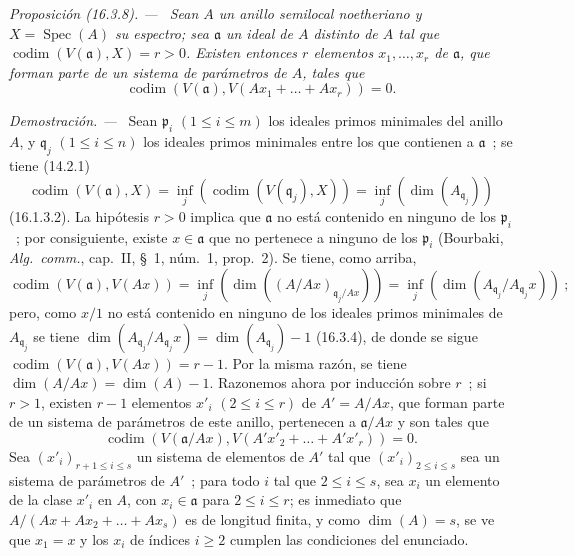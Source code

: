 \documentclass[10pt,oneside]{book}
\makeatletter
\newcommand{\setmanualcurrentlabel}[1]{\def\@currentlabel{#1}}
\newcommand{\oldpage}[2][]{%
  \setcounter{footnote}{0}%
  \marginpar{\scriptsize\textbf{#1}~|~#2}\ignorespaces}
\newenvironment{proposition}[1][]{%
  \setmanualcurrentlabel{#1}\par\medskip\noindent\itshape Proposición (#1). ---\ }{\par}
\newenvironment{proof}{%
  \par\medskip\noindent\textit{Demostración. ---\ }}{\par}
\makeatother
\begin{document}
\oldpage[0\textsubscript{IV-1}]{31}

\begin{proposition}[16.3.8]
\label{0.16.3.8-es}
Sean $A$ un anillo semilocal noetheriano y $X=\operatorname{Spec}(A)$ su
espectro; sea $\mathfrak{a}$ un ideal de $A$ distinto de $A$ tal que
$\operatorname{codim}(V(\mathfrak{a}),X)=r>0$. Existen entonces $r$ elementos
$x_1,\ldots,x_r$ de $\mathfrak{a}$, que forman parte de un sistema de parámetros
de $A$, tales que
\[
  \operatorname{codim}(V(\mathfrak{a}),
  V(Ax_1+\ldots+Ax_r))=0.
\]
\end{proposition}

\begin{proof}
Sean $\mathfrak{p}_i$ $(1\leq i\leq m)$ los ideales primos minimales del
anillo $A$, y $\mathfrak{q}_j$ $(1\leq i\leq n)$ los ideales primos minimales
entre los que contienen a $\mathfrak{a}$~; se tiene (14.2.1)
\[
  \operatorname{codim}(V(\mathfrak{a}),X)
  =\inf_j(\operatorname{codim}(V(\mathfrak{q}_j),X))
  =\inf_j(\dim(A_{\mathfrak{q}_j}))
\]
(16.1.3.2). La hipótesis $r>0$ implica que $\mathfrak{a}$ no está contenido en
ninguno de los $\mathfrak{p}_i$~; por consiguiente, existe
$x\in\mathfrak{a}$ que no pertenece a ninguno de los $\mathfrak{p}_i$
(Bourbaki, \emph{Alg.~comm.}, cap.~II, \S~1, núm.~1, prop.~2). Se tiene, como
arriba,
\[
  \operatorname{codim}(V(\mathfrak{a}),V(Ax))
  =\inf_j(\dim((A/Ax)_{\mathfrak{q}_j/Ax}))
  =\inf_j(\dim(A_{\mathfrak{q}_j}/A_{\mathfrak{q}_j}x))~;
\]
pero, como $x/1$ no está contenido en ninguno de los ideales primos minimales
de $A_{\mathfrak{q}_j}$ se tiene
$\dim(A_{\mathfrak{q}_j}/A_{\mathfrak{q}_j}x)
=\dim(A_{\mathfrak{q}_j})-1$ (16.3.4), de donde se sigue
$\operatorname{codim}(V(\mathfrak{a}),V(Ax))=r-1$. Por la misma razón, se tiene
$\dim(A/Ax)=\dim(A)-1$. Razonemos ahora por inducción sobre $r$~; si
$r>1$, existen $r-1$ elementos $x'_i$ $(2\leq i\leq r)$ de $A'=A/Ax$,
que forman parte de un sistema de parámetros de este anillo, pertenecen a
$\mathfrak{a}/Ax$ y son tales que
\[
  \operatorname{codim}(V(\mathfrak{a}/Ax),
  V(A'x'_2+\ldots+A'x'_r))=0.
\]
Sea $(x'_i)_{r+1\leq i\leq s}$ un sistema de elementos de $A'$ tal que
$(x'_i)_{2\leq i\leq s}$ sea un sistema de parámetros de $A'$~; para todo
$i$ tal que $2\leq i\leq s$, sea $x_i$ un elemento de la clase $x'_i$ en
$A$, con $x_i\in\mathfrak{a}$ para $2\leq i\leq r$; es inmediato que
$A/(Ax+Ax_2+\ldots+Ax_s)$ es de longitud finita, y como $\dim(A)=s$, se ve
que $x_1=x$ y los $x_i$ de índices $i\geq2$ cumplen las condiciones del
enunciado.
\end{proof}
\end{document}
